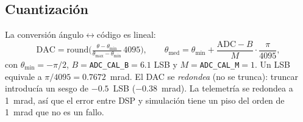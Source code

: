 \documentclass[11pt,a4paper]{article}
\begin{document}
\subsection{Cuantizaci\'on}
La conversi\'on \'angulo$\leftrightarrow$c\'odigo es lineal:
\begin{equation}
\mathrm{DAC}=\mathrm{round}\!\Big(\tfrac{\theta-\theta_{\min}}{\theta_{\max}-\theta_{\min}}\,4095\Big),\qquad
\theta_{\mathrm{med}}=\theta_{\min}+\frac{\mathrm{ADC}-B}{M}\cdot\frac{\pi}{4095},
\end{equation}
con $\theta_{\min}=-\pi/2$, $B=$\texttt{ADC\_CAL\_B}$=6.1$ LSB y $M=$\texttt{ADC\_CAL\_M}$=1$.
Un LSB equivale a $\pi/4095=0.7672$~mrad. El DAC se \emph{redondea} (no se trunca): truncar
introduc\'ia un sesgo de $-0.5$~LSB ($-0.38$~mrad). La telemetr\'ia se redondea a 1~mrad, as\'i que
el error entre DSP y simulaci\'on tiene un piso del orden de 1~mrad que no es un fallo.

\end{document}
